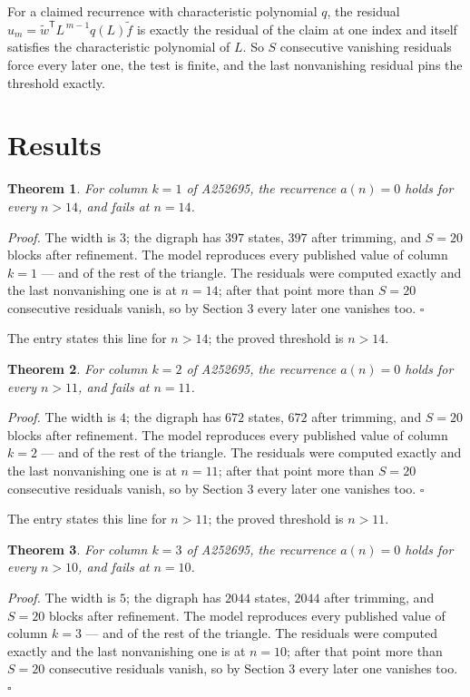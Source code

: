 \documentclass[11pt]{article}
\newtheorem{theorem}{Theorem}
\theoremstyle{definition}
\begin{document}
For a claimed recurrence with characteristic polynomial $q$, the residual $u_m = \tilde w^{\mathsf T}L^{\,m-1}q(L)\tilde f$ is exactly the residual of the claim at one index and itself satisfies the characteristic polynomial of $L$. So $S$ consecutive vanishing residuals force every later one, the test is finite, and the last nonvanishing residual pins the threshold exactly.

\section{Results}

\begin{theorem} For column $k = 1$ of A252695, the recurrence $a(n) = 0$ holds for every $n > 14$, and fails at $n = 14$.\end{theorem}

{\itshape Proof.} The width is $3$; the digraph has $397$ states, $397$ after trimming, and $S = 20$ blocks after refinement. The model reproduces every published value of column $k = 1$ --- and of the rest of the triangle. The residuals were computed exactly and the last nonvanishing one is at $n = 14$; after that point more than $S = 20$ consecutive residuals vanish, so by Section 3 every later one vanishes too. $\square$

The entry states this line for $n > 14$; the proved threshold is $n > 14$.

\begin{theorem} For column $k = 2$ of A252695, the recurrence $a(n) = 0$ holds for every $n > 11$, and fails at $n = 11$.\end{theorem}

{\itshape Proof.} The width is $4$; the digraph has $672$ states, $672$ after trimming, and $S = 20$ blocks after refinement. The model reproduces every published value of column $k = 2$ --- and of the rest of the triangle. The residuals were computed exactly and the last nonvanishing one is at $n = 11$; after that point more than $S = 20$ consecutive residuals vanish, so by Section 3 every later one vanishes too. $\square$

The entry states this line for $n > 11$; the proved threshold is $n > 11$.

\begin{theorem} For column $k = 3$ of A252695, the recurrence $a(n) = 0$ holds for every $n > 10$, and fails at $n = 10$.\end{theorem}

{\itshape Proof.} The width is $5$; the digraph has $2044$ states, $2044$ after trimming, and $S = 20$ blocks after refinement. The model reproduces every published value of column $k = 3$ --- and of the rest of the triangle. The residuals were computed exactly and the last nonvanishing one is at $n = 10$; after that point more than $S = 20$ consecutive residuals vanish, so by Section 3 every later one vanishes too. $\square$
\end{document}
